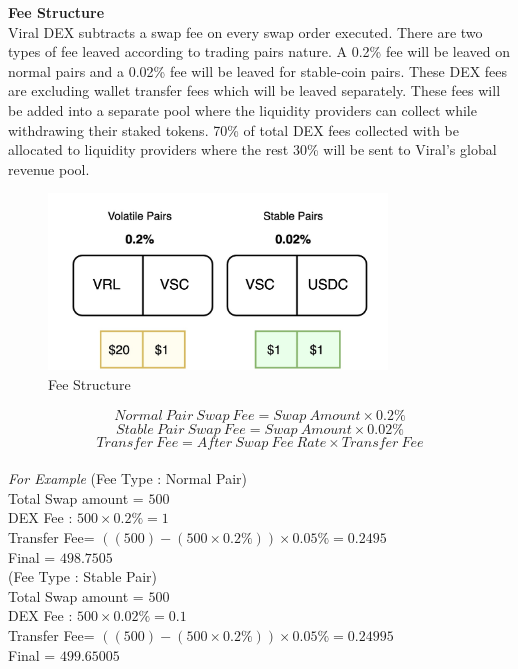 \documentclass[10pt]{article}
\begin{document}
\textbf{Fee Structure}\\

Viral DEX subtracts a swap fee on every swap order executed. There are two types of fee leaved according to trading pairs nature. A 0.2\% fee will be leaved on normal pairs and a 0.02\% fee will be leaved for stable-coin pairs. These DEX fees are excluding wallet transfer fees which will be leaved separately. These fees will be added into a separate pool where the liquidity providers can collect while withdrawing their staked tokens. 70\% of total DEX fees collected with be allocated to liquidity providers where the rest 30\% will be sent to Viral's global revenue pool.\\

\begin{figure}[H]
\begin{center}
\includegraphics[width=9cm]{dex-fee}
\caption{Fee Structure}
\end{center}
\end{figure}

\begin{equation}
Normal\:Pair\:Swap\:Fee=Swap\:Amount \times  0.2\%
\end{equation}
\begin{equation}
Stable\:Pair\:Swap\:Fee=Swap\:Amount \times  0.02\%
\end{equation}
\begin{equation}
Transfer\:Fee=After\:Swap\:Fee\:Rate \times  Transfer\:Fee
\end{equation}\\

\textit{For Example} 
(Fee Type : Normal Pair) \\
Total Swap amount = $500$\\
DEX Fee : $500 \times  0.2\% = 1$ \\
Transfer Fee= $((500)-(500 \times  0.2\%)) \times  0.05\% = 0.2495$ \\
Final = $498.7505$\\

(Fee Type : Stable Pair) \\
Total Swap amount = $500$\\
DEX Fee : $500 \times  0.02\% = 0.1$ \\
Transfer Fee= $((500)-(500 \times  0.2\%)) \times  0.05\% = 0.24995$ \\
Final = $499.65005$\\
 
\end{document}

